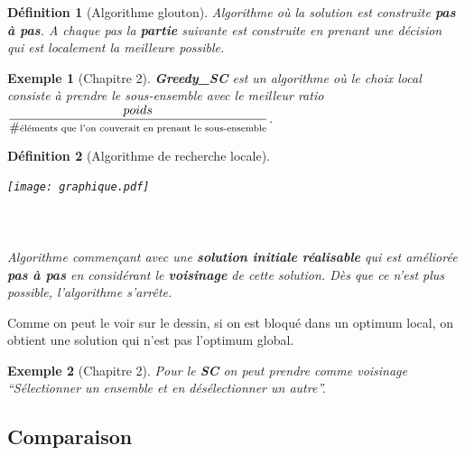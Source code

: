 \documentclass[12pt]{article}
\newcommand{\titre}[1]{\textcolor{title}{#1}}
\newtheorem{de}{D\'efinition}[section]
\newtheorem{exemple}{Exemple}[section]
\begin{document}
\begin{de}[Algorithme glouton]
Algorithme où la solution est construite \textbf{pas à pas}. A chaque pas la
\textbf{partie} suivante est construite en prenant une décision qui est
localement la meilleure possible.
\end{de}

\begin{exemple}[Chapitre 2] \textbf{Greedy\_SC} est un algorithme où le choix
local consiste à prendre le sous-ensemble avec le meilleur ratio
$\scriptsize \dfrac{poids}{\#\text{éléments que l'on couverait en prenant le sous-ensemble}
}$.
\end{exemple}

\begin{de}[Algorithme de recherche locale]
\begin{multicols}{2}
\texttt{[image: graphique.pdf]}
$ $\\$ $\\$ $\\$ $\\
Algorithme commençant avec une \textbf{solution initiale réalisable} qui est
améliorée \textbf{pas à pas} en considérant le \textbf{voisinage} de cette
solution. Dès que ce n'est plus possible, l'algorithme s'arrête.
\end{multicols}
\end{de}
Comme on peut le voir sur le dessin, si on est bloqué dans un optimum local,
on obtient une solution qui n'est pas l'optimum global.
\begin{exemple}[Chapitre 2]
Pour le \textbf{\titre{SC}} on peut prendre comme voisinage
``Sélectionner un ensemble et en désélectionner un autre''.
\end{exemple}

\subsection*{Comparaison}
\end{document}
